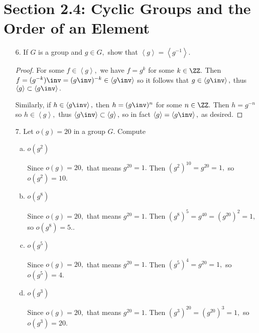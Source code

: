 \documentclass{article}
\begin{document}
\section*{Section 2.4: Cyclic Groups and the Order of an Element}
\begin{itemize}
	\item[6.] If $G$ is a group and $g\in G,$ show that $\left< g\right>=\left< g^{-1}\right>.$
		\begin{proof}
			For some $f\in\left< g\right>,$ we have $f=g^k$ for some $k\in\ZZ.$ Then $f=(g^{-k})\inv=(g\inv)^{-k}\in\left< g\inv\right>$ so it follows that $g\in \left< g\inv\right>,$ thus $\left< g\right>\subset\left< g\inv\right>.$

			Similarly, if $h\in\left< g\inv\right>,$ then $h=(g\inv)^n$ for some $n\in\ZZ.$ Then $h=g^{-n}$ so $h\in \left< g\right>,$ thus $\left< g\inv\right>\subset\left< g\right>,$ so in fact $\left< g\right>=\left< g\inv\right>,$ as desired.

		\end{proof}

		\newpage
	\item[7.] Let $o(g)=20$ in a group $G.$ Compute
		\begin{enumerate}[(a)]
			\item $o(g^2)$ 
				\begin{answer*}
					Since $o(g)=20,$ that means $g^{20}=1.$ Then $(g^2)^{10}=g^{20}=1,$ so $o(g^2)=\boxed{10.}$
				\end{answer*}

			\item $o(g^8)$
				\begin{answer*}
					Since $o(g)=20,$ that means $g^{20}=1.$ Then $(g^8)^5=g^{40}=(g^{20})^2=1,$ so $o(g^8)=\boxed{5.}.$
				\end{answer*}

			\item $o(g^5)$
				\begin{answer*}
					Since $o(g)=20,$ that means $g^{20}=1.$ Then $(g^5)^4=g^{20}=1,$ so $o(g^5)=\boxed{4.}$
				\end{answer*}

			\item $o(g^3)$
				\begin{answer*}
					Since $o(g)=20,$ that means $g^{20}=1.$ Then $(g^3)^{20}=(g^{20})^3=1,$ so $o(g^3)=\boxed{20.}$
				\end{answer*}
				
		\end{enumerate}


\end{itemize}
\end{document}
